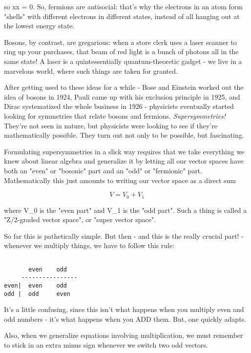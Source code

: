so xx = 0.   So, fermions are antisocial: that's why the electrons
in an atom form "shells" with different electrons in different states,
instead of all hanging out at the lowest energy state. 

Bosons, by contrast, are gregarious: when a store clerk uses a laser 
scanner to ring up your purchases, that beam of red light is a bunch of 
photons all in the same state!   A laser is a quintessentially 
quantum-theoretic gadget - we live in a marvelous world, where such things are
taken for granted.

After getting used to these ideas for a while - Bose and Einstein worked 
out the idea of bosons in 1924, Pauli came up with his exclusion principle 
in 1925, and Dirac systematized the whole business in 1926 - physicists
eventually started looking for symmetries that relate bosons and fermions.
\emph{Supersymmetries!}  They're not seen in nature, but physicists 
were looking
to see if they're mathematically possible.  They turn out not only to
be possible, but fascinating.  

Formulating supersymmetries in a slick way requires that we take 
everything we knew about linear algebra and generalize it by letting
all our vector spaces have both an "even" or "bosonic" part and an
"odd" or "fermionic" part.  
Mathematically this just amounts to writing 
our vector space as a direct sum


$$

V = V_{0} + V_{1}
$$
    
where V_{0} is the "even part" and V_{1} is 
the "odd part".  Such a thing
is called a "Z/2-graded vector space", 
or "super vector space".  

So far this is pathetically simple.  But then - and this is the really 
crucial part! - whenever we multiply things, we have to follow this rule:


\begin{verbatim}

       even    odd
     ----------------
even|  even    odd
odd |  odd     even
\end{verbatim}
    
It's a little confusing, since this isn't what happens when you
multiply even and odd numbers - it's what happens when you ADD them.  
But, one quickly adapts.  

Also, when we generalize equations involving multiplication, we must 
remember to stick in an extra minus sign whenever we switch two odd 
vectors.  

